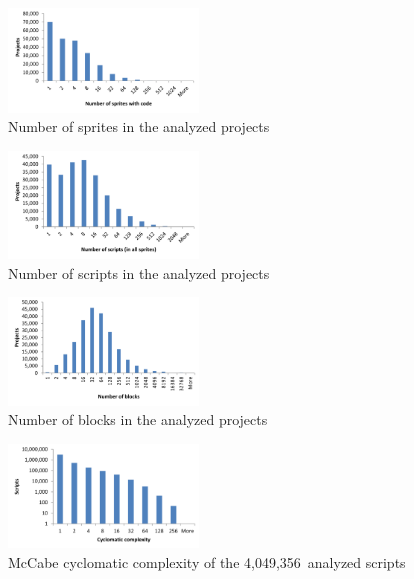\documentclass{sig-alternate}
\newcommand{\nscripts}{4,049,356}
\begin{document}
\begin{figure}
	\centering
	\includegraphics[width=0.45\textwidth]{fig/charts/1sprites}
	\vspace{-1em}
	\caption{Number of sprites in the analyzed projects}
	\label{fig:size-sprites}
\end{figure}
\begin{figure}
	\centering
	\includegraphics[width=0.45\textwidth]{fig/charts/1scripts}
	\vspace{-1em}
	\caption{Number of scripts in the analyzed projects}
	\label{fig:size-scripts}
\end{figure}
\begin{figure}
	\centering
	\includegraphics[width=0.45\textwidth]{fig/charts/1locs}
	\vspace{-1em}
	\caption{Number of blocks in the analyzed projects}
	\label{fig:size-locs}
\end{figure}
\begin{figure}
	\centering
	\includegraphics[width=0.45\textwidth]{fig/charts/3cyclomatic}
	\vspace{-1em}
	\caption{McCabe cyclomatic complexity of the \nscripts~analyzed scripts}
	\label{fig:cyclomatic}
\end{figure}
\end{document}
